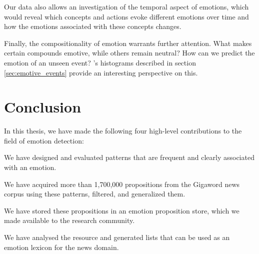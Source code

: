 Our data also allows an investigation of the temporal aspect of emotions, which would reveal which concepts and actions evoke different emotions over time and how the emotions associated with these concepts changes.

Finally, the compositionality of emotion warrants further attention. What makes certain compounds emotive, while others remain neutral? How can we predict the emotion of an unseen event? \citeauthor{mutual_action}'s histograms described in section \ref{sec:emotive_events} provide an interesting perspective on this.

\section{Conclusion} \label{sec:conclusion}

In this thesis, we have made the following four high-level contributions to the field of emotion detection:

\begin{aenumerate}
	\item We have designed and evaluated patterns that are frequent and clearly associated with an emotion.
	\item We have acquired more than 1,700,000 propositions from the Gigaword news corpus using these patterns, filtered, and generalized them.
	\item We have stored these propositions in an emotion proposition store, which we made available to the research community.
	\item We have analysed the resource and generated lists that can be used as an emotion lexicon for the news domain.
\end{aenumerate}


